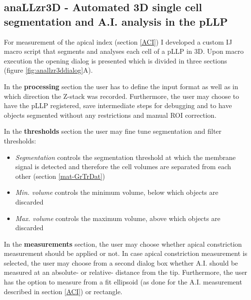 \documentclass[10pt, b5paper, singlespacinge, twoside]{reedthesis} %
\providecommand{\tightlist}{%
  \setlength{\itemsep}{0pt}\setlength{\parskip}{0pt}}
\theoremstyle{definition}
\theoremstyle{definition}
\theoremstyle{definition}
\theoremstyle{remark}
\begin{document}
\hypertarget{mat-anallzr3d}{%
\subsection{anaLLzr3D - Automated 3D single cell segmentation and A.I. analysis in the pLLP}\label{mat-anallzr3d}}

For measurement of the apical index (section \ref{ACI}) I developed a custom IJ macro script that segments and analyses each cell of a pLLP in 3D. Upon macro execution the opening dialog is presented which is divided in three sections (figure \ref{fig:anallzr3ddialog}A).

In the \textbf{processing} section the user has to define the input format as well as in which direction the Z-stack was recorded. Furthermore, the user may choose to have the pLLP registered, save intermediate steps for debugging and to have objects segmented without any restrictions and manual ROI correction.

In the \textbf{thresholds} section the user may fine tune segmentation and filter thresholds:
\begin{itemize}
\tightlist
\item
  \emph{Segmentation} controls the segmentation threshold at which the membrane signal is detected and therefore the cell volumes are separated from each other (section \ref{mat-GrTrDat})
\item
  \emph{Min. volume} controls the minimum volume, below which objects are discarded
\item
  \emph{Max. volume} controls the maximum volume, above which objects are discarded
\end{itemize}
In the \textbf{measurements} section, the user may choose whether apical constriction measurement should be applied or not. In case apical constriction measurement is selected, the user may choose from a second dialog box whether A.I. should be measured at an absolute- or relative- distance from the tip. Furthermore, the user has the option to measure from a fit ellipsoid (as done for the A.I. measurement described in section \ref{ACI}) or rectangle.
\end{document}
